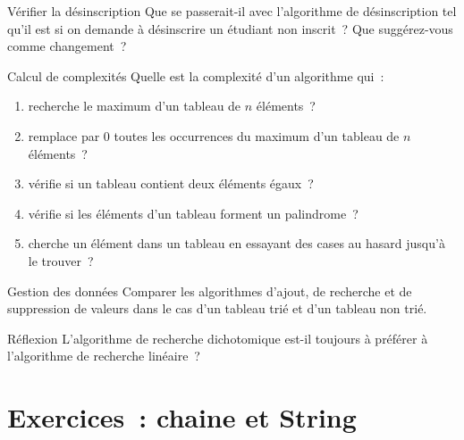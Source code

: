 	\begin{Exercice}{Vérifier la désinscription}
		Que se passerait-il avec l’algorithme
		de désinscription tel qu’il est
		si on demande à désinscrire un étudiant non inscrit~?
		Que suggérez-vous comme changement~?
	\end{Exercice}


	\begin{Exercice}{Calcul de complexités}
		Quelle est la complexité d’un algorithme qui~:		
		\begin{enumerate}[label=\alph*)]
			\item 
				recherche le maximum d’un tableau de $n$ éléments~?
			\item 
				remplace par 0 toutes les occurrences du maximum 
				d’un tableau de $n$ éléments~?
			\item 
				vérifie si un tableau contient deux éléments égaux~?
			\item 
				vérifie si les éléments d’un tableau forment un palindrome~?
			\item
				cherche un élément dans un tableau 
				en essayant des cases au hasard jusqu’à le trouver~?
		\end{enumerate}
	\end{Exercice}

	\begin{Exercice}{Gestion des données}
		Comparer les algorithmes d’ajout, 
		de recherche et de suppression
		de valeurs dans le cas d’un tableau trié
		et d’un tableau non trié.
	\end{Exercice}

	\begin{Exercice}{Réflexion}
		L’algorithme de recherche dichotomique 
		est-il toujours à préférer à
		l’algorithme de recherche linéaire~?
	\end{Exercice}



	



	
	
	
	
\section{Exercices~: chaine et String}

